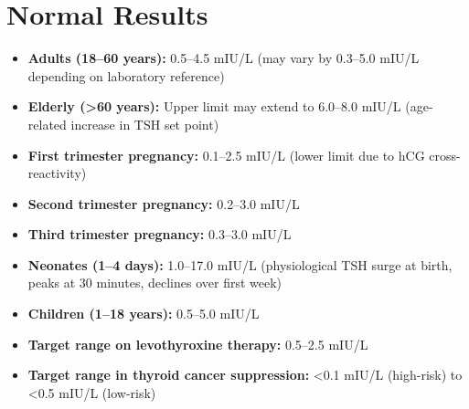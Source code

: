 \section*{Normal Results}
\begin{itemize}
  \item \textbf{Adults (18--60 years):} 0.5--4.5 mIU/L (may vary by 0.3--5.0 mIU/L depending on laboratory reference)
  \item \textbf{Elderly (>60 years):} Upper limit may extend to 6.0--8.0 mIU/L (age-related increase in TSH set point)
  \item \textbf{First trimester pregnancy:} 0.1--2.5 mIU/L (lower limit due to hCG cross-reactivity)
  \item \textbf{Second trimester pregnancy:} 0.2--3.0 mIU/L
  \item \textbf{Third trimester pregnancy:} 0.3--3.0 mIU/L
  \item \textbf{Neonates (1--4 days):} 1.0--17.0 mIU/L (physiological TSH surge at birth, peaks at 30 minutes, declines over first week)
  \item \textbf{Children (1--18 years):} 0.5--5.0 mIU/L
  \item \textbf{Target range on levothyroxine therapy:} 0.5--2.5 mIU/L
  \item \textbf{Target range in thyroid cancer suppression:} <0.1 mIU/L (high-risk) to <0.5 mIU/L (low-risk)
\end{itemize}

